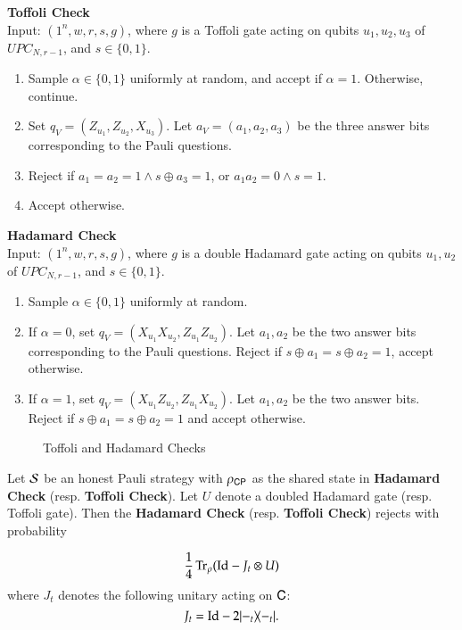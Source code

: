 \vspace{10pt}
\begin{center}
\begin{mdframed}
    \textbf{Toffoli Check} \\
	Input: $(1^n,w,r,s,g)$, where $g$ is a Toffoli gate acting on qubits $u_1,u_2,u_3$ of $UPC_{N,r-1}$, and $s \in \{0,1\}$. 
	\begin{enumerate}
		\item Sample $\alpha \in \{0,1\}$ uniformly at random, and accept if $\alpha = 1$. Otherwise, continue.
		\item Set $q_V = (Z_{u_1},Z_{u_2},X_{u_3})$. Let $a_V = (a_1,a_2,a_3)$ be the three answer bits corresponding to the Pauli questions.

		\item Reject if $a_1 = a_2 = 1 \wedge s \oplus a_3 = 1$, or $a_1 a_2 = 0 \wedge s = 1$.
		\item Accept otherwise.
	\end{enumerate}    
    \vspace{10pt}
\textbf{Hadamard Check} \\
	Input: $(1^n,w,r,s,g)$, where $g$ is a double Hadamard gate acting on qubits $u_1,u_2$ of $UPC_{N,r-1}$, and $s \in \{0,1\}$.

	\begin{enumerate}
		\item Sample $\alpha \in \{0,1\}$ uniformly at random.
		\item If $\alpha = 0$, set $q_V = ( X_{u_1} X_{u_2}, Z_{u_1} Z_{u_2})$. Let $a_1,a_2$ be the two answer bits corresponding to the Pauli questions. Reject if $s \oplus a_1 = s \oplus a_2 = 1$, accept otherwise.
		
		\item If $\alpha = 1$, set $q_V = (X_{u_1}Z_{u_2},Z_{u_1} X_{u_2})$. Let $a_1,a_2$ be the two answer bits. Reject if $s \oplus a_1 = s \oplus a_2 = 1$ and accept otherwise.
	\end{enumerate}    
\end{mdframed}

\end{center}
\begin{figure}[H]
\caption{Toffoli and Hadamard Checks}
\label{fig:toffoli_hadamard_check}
\end{figure}

\begin{lemma}
\label{lem:ver_gate_check}
	Let $\mathcal{S}$ be an honest Pauli strategy with $\rho_{{\mathsf{C}} {\mathsf{P}}}$ as the shared state in \textbf{Hadamard Check} (resp. \textbf{Toffoli Check}). Let $U$ denote a doubled Hadamard gate (resp. Toffoli gate). Then the \textbf{Hadamard Check} (resp. \textbf{Toffoli Check}) rejects with probability 
	
	\[
		\frac{1}{4} \operatorname{Tr}_{\rho} ( \mathop{\mathrm{Id}}\!\mathinner{} - J_t \otimes U )
	\]
	where $J_t$ denotes the following unitary acting on ${\mathsf{C}}$:
	\[
		J_t = \mathop{\mathrm{Id}}\!\mathinner{} - 2|-_t\rangle\! \langle -_t|.
	\]
\end{lemma}


